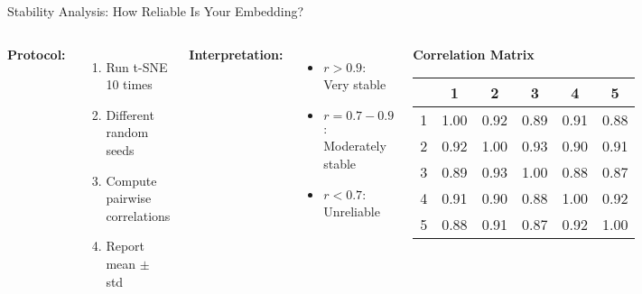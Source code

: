 \documentclass[aspectratio=169]{beamer}
\begin{document}
\begin{frame}{Stability Analysis: How Reliable Is Your Embedding?}
\begin{columns}
\textbf{Protocol:}
\begin{enumerate}
    \item Run t-SNE 10 times
    \item Different random seeds
    \item Compute pairwise correlations
    \item Report mean $\pm$ std
\end{enumerate}

\textbf{Interpretation:}
\begin{itemize}
    \item $r > 0.9$: Very stable
    \item $r = 0.7-0.9$: Moderately stable
    \item $r < 0.7$: Unreliable
\end{itemize}

\begin{center}
\textbf{Correlation Matrix}\\[0.3cm]
\begin{tabular}{|c|c|c|c|c|c|}
\hline
 & 1 & 2 & 3 & 4 & 5 \\
\hline
1 & 1.00 & 0.92 & 0.89 & 0.91 & 0.88 \\
\hline
2 & 0.92 & 1.00 & 0.93 & 0.90 & 0.91 \\
\hline
3 & 0.89 & 0.93 & 1.00 & 0.88 & 0.87 \\
\hline
4 & 0.91 & 0.90 & 0.88 & 1.00 & 0.92 \\
\hline
5 & 0.88 & 0.91 & 0.87 & 0.92 & 1.00 \\
\hline
\end{tabular}
\end{center}
\end{columns}
\end{frame}
\end{document}
